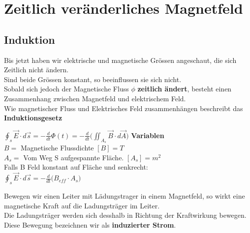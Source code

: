 




\newpage

\section{Zeitlich veränderliches Magnetfeld}

\subsection{Induktion}

Bis jetzt haben wir elektrische und magnetische Grössen angeschaut, die sich Zeitlich nicht ändern. \\
Sind beide Grössen konstant, so beeinflussen sie sich nicht. \\
Sobald sich jedoch der Magnetische Fluss $\phi$  \textbf{zeitlich ändert}, besteht einen Zusammenhang zwischen Magnetfeld und elektrischem Feld. \\
Wie magnetischer Fluss und Elektrisches Feld zusammenhängen beschreibt das \textbf{Induktionsgesetz}


\begingl
\formulaBegin
  $\displaystyle \oint_s \vec{E}\cdot d\vec{s} = -\frac{d}{dt}\Phi(t) =  -\frac{d}{dt} \big ( \iint_{A_s} \vec{B} \cdot d\vec{A} \big )$
\formulaEnd
\textbf{Variablen} \\
$B = $ Magnetische Flussdichte $[B] = T$\\
$A_s = $ Vom Weg S aufgespannte Fläche. $[A_s] = m^2$ \\

Falls B Feld konstant auf Fläche und senkrecht: \\

\formulaBegin
  $\displaystyle  \oint_s \vec{E}\cdot d\vec{s} = -\frac{d}{dt} \big ( B_{eff} \cdot A_s \big ) $
\formulaEnd
\iend

Bewegen wir einen Leiter mit Lädungstrager in einem Magnetfeld, so wirkt eine magnetische Kraft auf die Ladungsträger im Leiter. \\
Die Ladungsträger werden sich desshalb in Richtung der Kraftwirkung bewegen. Diese Bewegung bezeichnen wir als \textbf{induzierter Strom}. \\

